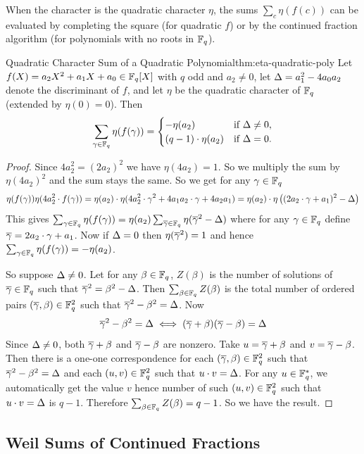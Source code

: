 When the character is the quadratic character $\eta$, the sums $\sum_c\eta(f(c))$ can be evaluated by completing the square (for quadratic $f$) or by the continued fraction algorithm (for polynomials with no roots in $\mathbb{F}_q$).
\begin{Theorem}{Quadratic Character Sum of a Quadratic Polynomial}{thm:eta-quadratic-poly}
  Let $f(X)=a_2X^2+a_1X+a_0\in\mathbb{F}_q[X]$ with $q$ odd and $a_2\neq 0$, let $\Delta=a_1^2-4a_0a_2$ denote the discriminant of $f$, and let $\eta$ be the quadratic character of $\mathbb{F}_q$ (extended by $\eta(0)=0$). Then $$\sum_{\gamma\in\mathbb{F}_q}\eta(f(\gamma))=\begin{cases}-\eta(a_2) & \text{if }\Delta\neq 0,\\ (q-1)\cdot \eta(a_2) & \text{if }\Delta=0.\end{cases}$$
\end{Theorem}
\begin{proof}
  Since $4a_2^2=(2a_2)^2$ we have $\eta(4a_2)=1$. So we multiply the sum by $\eta(4a_2)^2$ and the sum stays the same. So we get for any $\gamma\in\mathbb{F}_q$ $$\eta(f(\gamma))\eta(4a_2^2\cdot f(\gamma))= \eta(a_2)\cdot \eta(4a_2^2\cdot \gamma^2+4a_1a_2\cdot \gamma+4a_2a_1)=\eta(a_2)\cdot \eta\left( (2a_2\cdot \gamma+a_1)^2-\Delta \right)$$This gives $\sum_{\gamma\in\mathbb{F}_q}\eta(f(\gamma))=\eta(a_2)\sum_{\overline{\gamma}\in\mathbb{F}_q}\eta(\overline{\gamma}^2-\Delta)$ where for any $\gamma\in\mathbb{F}_q$ define $\overline{\gamma}=2a_2\cdot \gamma+a_1$. Now if $\Delta=0$ then $\eta(\overline{\gamma}^2)=1$ and hence $\sum_{\gamma\in\mathbb{F}_q}\eta(f(\gamma))=-\eta(a_2)$. 
  
  So suppose $\Delta\neq 0$. Let for any $\beta\in\mathbb{F}_q$, $Z(\beta)$ is the number of solutions of $\overline{\gamma}\in\mathbb{F}_q$ such that $\overline{\gamma}^2=\beta^2-\Delta$. Then $\sum_{\beta\in\mathbb{F}_q}Z(\beta)$ is the total number of ordered pairs $(\overline{\gamma},\beta)\in\mathbb{F}_q^2$ such that $\overline{\gamma}^2-\beta^2=\Delta$. Now $$\overline{\gamma}^2-\beta^2=\Delta\iff (\overline{\gamma}+\beta)(\overline{\gamma}-\beta)=\Delta$$Since $\Delta\neq 0$, both $\overline{\gamma}+\beta$ and $\overline{\gamma}-\beta$ are nonzero. Take $u=\overline{\gamma}+\beta$ and $v=\overline{\gamma}-\beta$. Then there is a one-one correspondence for each $(\overline{\gamma},\beta)\in\mathbb{F}_q^2$ such that $\overline{\gamma}^2-\beta^2=\Delta$ and each $(u,v)\in\mathbb{F}_q^2$ such that $u\cdot v=\Delta$. For any $u\in\mathbb{F}_q^*$, we automatically get the value $v$ hence number of such $(u,v)\in\mathbb{F}_q^2$ such that $u\cdot v=\Delta$ is $q-1$. Therefore $\sum_{\beta\in\mathbb{F}_q}Z(\beta)=q-1$. So we have the result. 
\end{proof}

\subsection{Weil Sums of Continued Fractions}
%

